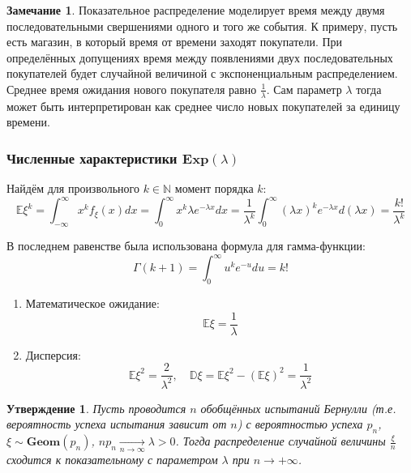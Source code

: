 \documentclass[oneside,final,14pt]{extreport}
\theoremstyle{plain}
\newtheorem*{thm*}{Утверждение}
\theoremstyle{definition}
\newtheorem*{rmrk}{Замечание}
\theoremstyle{named}
\begin{document}
\begin{rmrk}
    Показательное распределение моделирует время между двумя последовательными свершениями одного и того же события. К примеру, пусть есть магазин, в который время от времени заходят покупатели. При определённых допущениях время между появлениями двух последовательных покупателей будет случайной величиной с экспоненциальным распределением. Среднее время ожидания нового покупателя равно $\frac{1}{\lambda}$. Сам параметр $\lambda$ тогда может быть интерпретирован как среднее число новых покупателей за единицу времени. 
\end{rmrk}

\subsubsection{Численные характеристики $\mathbf{Exp}(\lambda)$}

Найдём для произвольного $k \in \mathbb{N}$ момент порядка $k$:
\begin{equation*}
    \mathbb{E} \xi^{k}=\int_{-\infty}^{\infty} x^{k} f_{\xi}(x) d x=\int_{0}^{\infty} x^{k} \lambda e^{-\lambda x} d x=\frac{1}{\lambda^{k}} \int_{0}^{\infty}(\lambda x)^{k} e^{-\lambda x} d(\lambda x)=\frac{k !}{\lambda^{k}}
\end{equation*}

В последнем равенстве была использована формула для гамма-функции:
\begin{equation*}
    \Gamma(k+1)=\int_{0}^{\infty} u^{k} e^{-u} d u=k !
\end{equation*}
\begin{enumerate}
    \item Математическое ожидание:
    \begin{equation*}
        \mathbb{E} \xi=\frac{1}{\lambda}
    \end{equation*}
    \item Дисперсия:
    \begin{equation*}
        \mathbb{E} \xi^{2}=\frac{2}{\lambda^{2}}, \quad \mathbb{D} \xi=\mathbb{E} \xi^{2}-(\mathbb{E} \xi)^{2}=\frac{1}{\lambda^{2}}
    \end{equation*}
\end{enumerate}

\begin{thm*}
    Пусть проводится $n$ обобщённых испытаний Бернулли (т.е. вероятность успеха испытания зависит от $n$) с вероятностью успеха $p_n$, $\xi \sim \mathbf{Geom}(p_n)$, $n p_{n} \underset{n \to \infty}{\longrightarrow} \lambda > 0$. Тогда распределение случайной величины $\frac{\xi}{n}$ сходится к показательному с параметром $\lambda$ при $n \to +\infty$.
\end{thm*}
\end{document}
